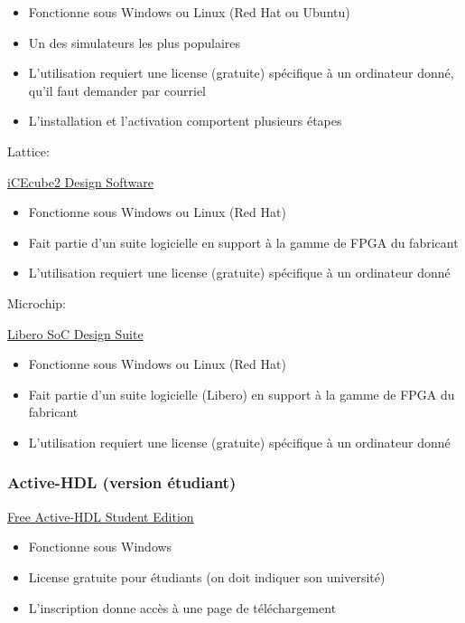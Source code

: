 \documentclass[11pt]{article}
\begin{document}
\begin{itemize}
\item Fonctionne sous Windows ou Linux (Red Hat ou Ubuntu)
\item Un des simulateurs les plus populaires
\item L'utilisation requiert une license (gratuite) spécifique à un
ordinateur donné, qu'il faut demander par courriel
\item L'installation et l'activation comportent plusieurs étapes
\end{itemize}


Lattice:

\href{http://www.latticesemi.com/icecube2}{iCEcube2 Design Software}

\begin{itemize}
\item Fonctionne sous Windows ou Linux (Red Hat)
\item Fait partie d'un suite logicielle en support à la gamme de FPGA du
fabricant
\item L'utilisation requiert une license (gratuite) spécifique à un
ordinateur donné
\end{itemize}

Microchip:

\href{https://www.microchip.com/en-us/products/fpgas-and-plds/fpga-and-soc-design-tools/fpga/libero-software-later-versions\#downloads}{Libero SoC Design Suite}

\begin{itemize}
\item Fonctionne sous Windows ou Linux (Red Hat)
\item Fait partie d'un suite logicielle (Libero) en support à la gamme de
FPGA du fabricant
\item L'utilisation requiert une license (gratuite) spécifique à un
ordinateur donné
\end{itemize}

\subsubsection{Active-HDL (version étudiant)}
\label{sec:org75e4f46}

\href{https://www.aldec.com/en/products/fpga\_simulation/active\_hdl\_student}{Free Active-HDL Student Edition}

\begin{itemize}
\item Fonctionne sous Windows
\item License gratuite pour étudiants (on doit indiquer son université)
\item L'inscription donne accès à une page de téléchargement
\end{itemize}
\end{document}
